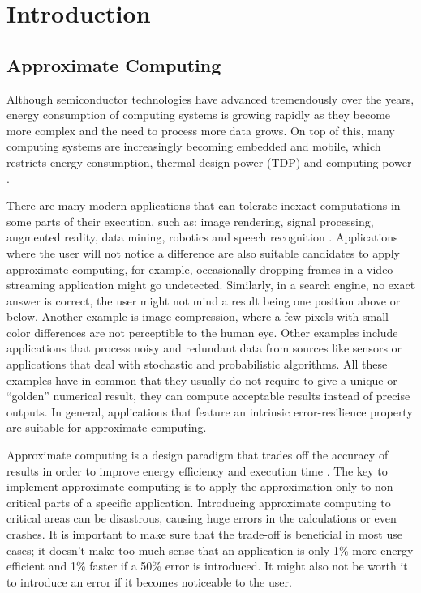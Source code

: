 \chapter{Introduction}
\label{ch:intro}

\section{Approximate Computing}

Although semiconductor technologies have advanced tremendously over the years, energy consumption of computing systems is growing rapidly as they become more complex and the need to process more data grows. On top of this, many computing systems are increasingly becoming embedded and mobile, which restricts energy consumption, thermal design power (TDP) and computing power \cite{Xu2016}.

There are many modern applications that can tolerate inexact computations in some parts of their execution, such as: image rendering, signal processing, augmented reality, data mining, robotics and speech recognition \cite{Yazdanbakhsh2016}. Applications where the user will not notice a difference are also suitable candidates to apply approximate computing, for example, occasionally dropping frames in a video streaming application might go undetected. Similarly, in a search engine, no exact answer is correct, the user might not mind a result being one position above or below. Another example is image compression, where a few pixels with small color differences are not perceptible to the human eye. Other examples include applications that process noisy and redundant data from sources like sensors or applications that deal with stochastic and probabilistic algorithms. All these examples have in common that they usually do not require to give a unique or ``golden'' numerical result, they can compute acceptable results instead of precise outputs. In general, applications that feature an intrinsic error-resilience property are suitable for approximate computing.

Approximate computing is a design paradigm that trades off the accuracy of results in order to improve energy efficiency and execution time \cite{Han2013}. The key to implement approximate computing is to apply the approximation only to non-critical parts of a specific application. Introducing approximate computing to critical areas can be disastrous, causing huge errors in the calculations or even crashes. It is important to make sure that the trade-off is beneficial in most use cases; it doesn't make too much sense that an application is only 1\% more energy efficient and 1\% faster if a 50\% error is introduced. It might also not be worth it to introduce an error if it becomes noticeable to the user.

